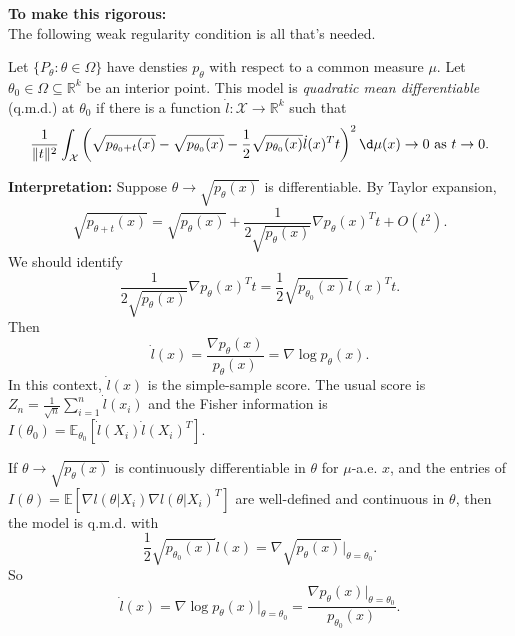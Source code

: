 \documentclass[a4paper]{article}
\begin{document}
\noindent \textbf{To make this rigorous:} \\
The following weak regularity condition is all that's needed.

\begin{defi}
	Let $\{P_\theta: \theta \in \Omega\}$ have densties $p_{\theta}$ with respect to a common measure $\mu$. Let $\theta_0 \in \Omega \subseteq \mathbb{R}^k$ be an interior point. This model is \emph{quadratic mean differentiable} (q.m.d.) at $\theta_0$ if there is a function $\dot{l}: \mathcal{X} \to \mathbb{R}^k$ such that
	\begin{equation}
		\frac{1}{\Vert t \Vert^2} \int_{\mathcal{X}} \left(\sqrt{p_{\theta_0+t}(x)} - \sqrt{p_{\theta_0}(x)} - \frac{1}{2} \sqrt{p_{\theta_0}(x)} \dot{l}(x)^T t\right)^2 \d \mu (x) \to 0 \text{ as } t \to 0.
	\end{equation}
\end{defi}

\noindent \textbf{Interpretation:} Suppose $\theta \to \sqrt{p_{\theta}(x)}$ is differentiable. By Taylor expansion,
\begin{equation*}
	\sqrt{p_{\theta+t}(x)} = \sqrt{p_{\theta}(x)} + \frac{1}{2\sqrt{p_{\theta}(x)}} \nabla p_{\theta}(x)^T t + O(t^2).
\end{equation*}
We should identify 
\begin{equation*}
	\frac{1}{2\sqrt{p_{\theta}(x)}} \nabla p_{\theta}(x)^T t = \frac{1}{2} \sqrt{p_{\theta_0}(x)} \dot{l}(x)^T t. 
\end{equation*}
Then
\begin{equation*}
	\dot{l} (x) = \frac{\nabla p_{\theta}(x)}{p_\theta(x)} = \nabla \log p_{\theta}(x).
\end{equation*}
In this context, $\dot{l}(x)$ is the simple-sample score. The usual score is $Z_n = \frac{1}{\sqrt{n}} \sum\limits_{i=1}^n \dot{l} (x_i)$ and the Fisher information is $I(\theta_0) = \mathbb{E}_{\theta_0} \left[\dot{l}(X_i) \dot{l}(X_i)^T \right]$.

\begin{prop}
	If $\theta \to \sqrt{p_{\theta}(x)}$ is continuously differentiable in $\theta$ for $\mu$-a.e. $x$, and the entries of $I(\theta) = \mathbb{E}\left[\nabla l(\theta|X_i) \nabla l(\theta|X_i)^T \right]$
	are well-defined and continuous in $\theta$, then the model is q.m.d. with
	\begin{equation*}
		\frac{1}{2} \sqrt{p_{\theta_0}(x)} \dot{l} (x) = \nabla \sqrt{p_{\theta}(x)} \big| _{\theta = \theta_0}.
	\end{equation*}
	So
	\begin{equation*}
		\dot{l} (x) = \nabla \log p_{\theta} (x) \big|_{\theta = \theta_0} = \frac{\nabla p_{\theta} (x) \big|_{\theta = \theta_0}}{p_{\theta_0}(x)}.
	\end{equation*}
\end{prop}
\end{document}
